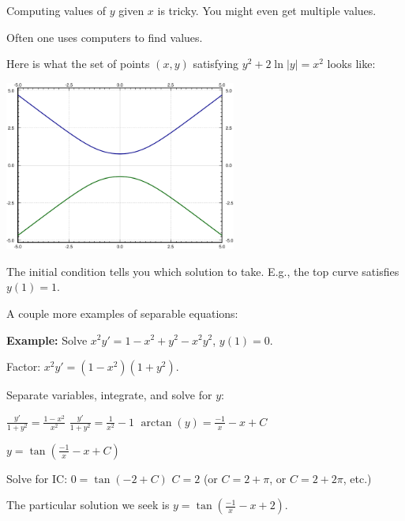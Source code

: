 \documentclass[10pt,aspectratio=169]{beamer}
\begin{document}
\begin{frame}
Computing values of $y$ given $x$ is tricky.
\pause
You might even get multiple values.

\medskip
\pause

Often one uses computers to find values.

\medskip
\pause

Here is what the set of points $(x,y)$ satisfying 
$y^2+2\ln|y|=x^2$ looks like:

\begin{center}
\includegraphics[width=3in]{../figures/implicitsols}
\end{center}

\medskip
\pause

The initial condition tells you which solution to take.
\pause
E.g., the top curve satisfies $y(1)=1$.

\end{frame}

\begin{frame}
A couple more examples of separable equations:

\medskip
\pause

\textbf{Example:}
Solve $x^2y' = 1 - x^2+y^2 - x^2y^2$, $y(1) = 0$.

\medskip
\pause

Factor:
\quad
$\displaystyle
x^2y' = (1 - x^2)(1+y^2)$.

\medskip
\pause

Separate variables, integrate, and solve for $y$:

\medskip
\pause

\quad
$\displaystyle
\frac{y'}{1+y^2} = \frac{1 - x^2}{x^2}$
\pause
\wthus
$\displaystyle
\frac{y'}{1+y^2} = \frac{1}{x^2} - 1$
\pause
\wthus
$\displaystyle
\operatorname{arctan} (y) = \frac{-1}{x} - x + C$

\medskip
\pause

\wthus
\quad
$\displaystyle
y = \tan \left(\frac{-1}{x} - x + C\right)$

\medskip
\pause

Solve for IC:
\quad
$0 = \tan(-2+C)$
\pause
\wthus
$C=2$ \pause (or $C = 2 + \pi$, or $C = 2 + 2\pi$, etc.)

\medskip
\pause

The particular solution we seek is
\quad
$\displaystyle
y = \tan \left(\frac{-1}{x} - x + 2 \right)$.

\end{frame}
\end{document}
